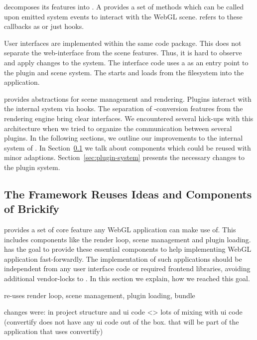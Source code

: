 \documentclass[../ClassicThesis.tex]{subfiles}
\begin{document}
{\brickify} decomposes its features into . A
 provides a set of methods which can be called upon
emitted system events to interact with the WebGL scene.
\citeauthor{brickify-thesis} refers to these callbacks as
 or just hooks.

User interfaces are implemented within the same code package. This
does not separate the web-interface from the scene features. Thus, it
is hard to observe and apply changes to the system. The
interface code uses a  as an entry point to the plugin
and scene system. The  starts  and loads
{\threedmodels} from the filesystem into the application.

{\brickify} provides abstractions for scene management and rendering.
Plugins interact with the internal system via hooks. The separation of
{\lego}-conversion features from the rendering engine bring clear
interfaces. We encountered several hick-ups with this architecture
when we tried to organize the communication between several plugins.
In the following sections, we outline our improvements to the internal
system of {\brickify}. In Section~\ref{sec:reuses-brickify} we talk
about components which could be reused with minor adaptions.
Section~\ref{sec:plugin-system} presents the necessary changes to the
plugin system.

\subsection{The Framework Reuses Ideas and Components of Brickify}
\label{sec:reuses-brickify}

{\brickify} provides a set of core feature any WebGL application can
make use of. This includes components like the render loop, scene
management and plugin loading. {\convertify} has the goal to provide
these essential components to help implementing WebGL application
fast-forwardly. The implementation of such applications should be
independent from any user interface code or required frontend
libraries, avoiding additional vendor-locks to {\threejs}. In this
section we explain, how we reached this goal.

re-uses render loop, scene management, plugin loading, bundle

changes were: in project structure and ui code <> lots of mixing with
ui code (convertify does not have any ui code out of the box. that
will be part of the application that uses convertify)
\end{document}
